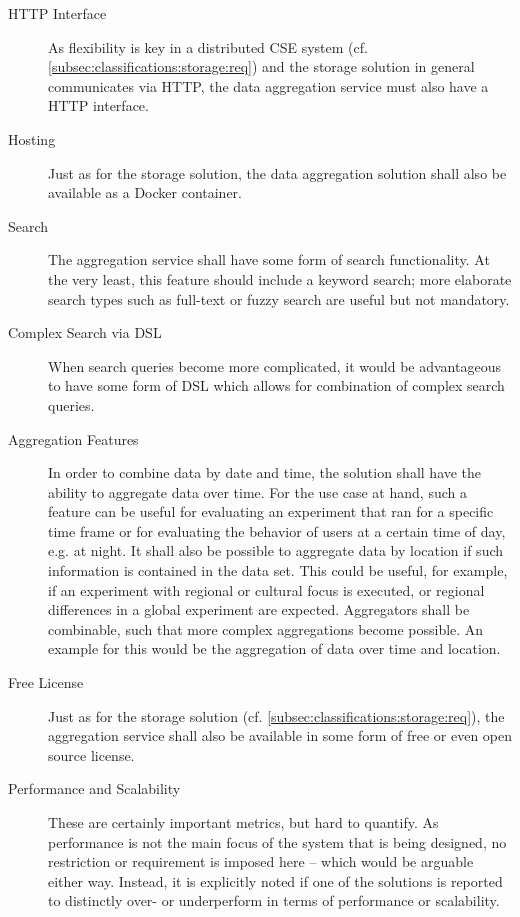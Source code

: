 \begin{description}
\item [HTTP Interface]
As flexibility is key in a distributed \ac{CSE} system (cf. \cref{subsec:classifications:storage:req}) and the storage solution in general communicates via HTTP, the data aggregation service must also have a HTTP interface.
\item [Hosting]
Just as for the storage solution, the data aggregation solution shall also be available as a Docker container.
\item [Search]
The aggregation service shall have some form of search functionality.
At the very least, this feature should include a keyword search; more elaborate search types such as full-text or fuzzy search are useful but not mandatory.
\item [Complex Search via DSL]
When search queries become more complicated, it would be advantageous to have some form of \ac{DSL} which allows for combination of complex search queries.
\item [Aggregation Features]
In order to combine data by date and time, the solution shall have the ability to aggregate data over time.
For the use case at hand, such a feature can be useful for evaluating an experiment that ran for a specific time frame or for evaluating the behavior of users at a certain time of day, e.g. at night.
It shall also be possible to aggregate data by location if such information is contained in the data set.
This could be useful, for example, if an experiment with regional or cultural focus is executed, or regional differences in a global experiment are expected.
Aggregators shall be combinable, such that more complex aggregations become possible.
An example for this would be the aggregation of data over time and location.
\item [Free License]
Just as for the storage solution (cf. \cref{subsec:classifications:storage:req}), the aggregation service shall also be available in some form of free or even open source license.
\item [Performance and Scalability]
These are certainly important metrics, but hard to quantify.
As performance is not the main focus of the system that is being designed, no restriction or requirement is imposed here -- which would be arguable either way.
Instead, it is explicitly noted if one of the solutions is reported to distinctly over- or underperform in terms of performance or scalability.
\end{description}

